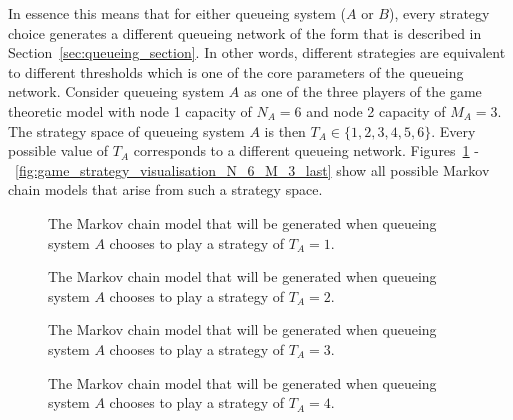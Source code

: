 In essence this means that for either queueing system  (\(A\) or \(B\)), every
strategy
choice generates a different queueing network of the form that is described in
Section~\ref{sec:queueing_section}.
In other words, different strategies are equivalent to different thresholds
which is one of the core parameters of the queueing network.
Consider queueing system \(A\) as one of the three players of the game theoretic
model with node 1 capacity of \(N_A = 6\) and node 2 capacity of \(M_A = 3\).
The strategy space of queueing system \(A\) is then
\(T_A \in \{1, 2, 3, 4, 5, 6\}\).
Every possible value of \(T_A\) corresponds to a different queueing network.
Figures~\ref{fig:game_strategy_visualisation_N_6_M_3_first}
-~\ref{fig:game_strategy_visualisation_N_6_M_3_last} show all possible Markov chain
models that arise from such a strategy space.

\begin{figure}[H]
    \centering
    \scalebox{0.8}{
        
    }
    \caption{The Markov chain model that will be generated when queueing system
    \(A\) chooses to play a strategy of \(T_A = 1\).}
    \label{fig:game_strategy_visualisation_N_6_M_3_first}
\end{figure}

\begin{figure}[H]
    \centering
    \scalebox{0.8}{
        
    }
    \caption{The Markov chain model that will be generated when queueing system
    \(A\) chooses to play a strategy of \(T_A = 2\).}
\end{figure}

\begin{figure}[H]
    \centering
    \scalebox{0.8}{
        
    }
    \caption{The Markov chain model that will be generated when queueing system
    \(A\) chooses to play a strategy of \(T_A = 3\).}
\end{figure}


\begin{figure}[H]
    \centering
    \scalebox{0.8}{
        
    }
    \caption{The Markov chain model that will be generated when queueing system
    \(A\) chooses to play a strategy of \(T_A = 4\).}
\end{figure}

